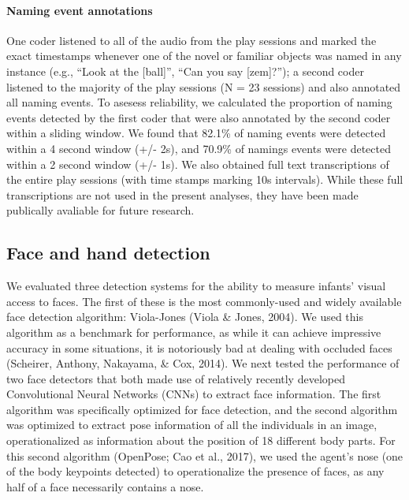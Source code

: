 \documentclass[english,man]{apa6}
\begin{document}
\paragraph{Naming event annotations}\label{naming-event-annotations}

One coder listened to all of the audio from the play sessions and marked
the exact timestamps whenever one of the novel or familiar objects was
named in any instance (e.g., \enquote{Look at the {[}ball{]}},
\enquote{Can you say {[}zem{]}?}); a second coder listened to the
majority of the play sessions (N = 23 sessions) and also annotated all
naming events. To asesess reliability, we calculated the proportion of
naming events detected by the first coder that were also annotated by
the second coder within a sliding window. We found that 82.1\% of naming
events were detected within a 4 second window (+/- 2s), and 70.9\% of
namings events were detected within a 2 second window (+/- 1s). We also
obtained full text transcriptions of the entire play sessions (with time
stamps marking 10s intervals). While these full transcriptions are not
used in the present analyses, they have been made publically avaliable
for future research.

\subsection{Face and hand detection}\label{face-and-hand-detection}

We evaluated three detection systems for the ability to measure infants'
visual access to faces. The first of these is the most commonly-used and
widely available face detection algorithm: Viola-Jones (Viola \& Jones,
2004). We used this algorithm as a benchmark for performance, as while
it can achieve impressive accuracy in some situations, it is notoriously
bad at dealing with occluded faces (Scheirer, Anthony, Nakayama, \& Cox,
2014). We next tested the performance of two face detectors that both
made use of relatively recently developed Convolutional Neural Networks
(CNNs) to extract face information. The first algorithm was specifically
optimized for face detection, and the second algorithm was optimized to
extract pose information of all the individuals in an image,
operationalized as information about the position of 18 different body
parts. For this second algorithm (OpenPose; Cao et al., 2017), we used
the agent's nose (one of the body keypoints detected) to operationalize
the presence of faces, as any half of a face necessarily contains a
nose.
\end{document}
